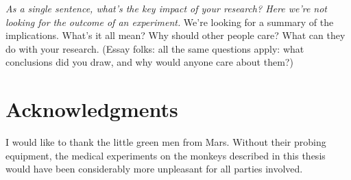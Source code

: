 \emph{As a single sentence, what’s the key impact of your research?
  Here we’re not looking for the outcome of an experiment.
}
We’re looking for a summary of the implications.
What’s it all mean?
Why should other people care?
What can they do with your research.
(Essay folks: all the same questions apply: what conclusions did you draw, and why would anyone care about them?)

\pagestyle{scrheadings}
\clearpage

\chapter*{Acknowledgments}
I would like to thank the little green men from Mars.
Without their probing equipment, the medical experiments on the monkeys described in this thesis would have been considerably more unpleasant for all parties involved.
\clearpage



%
%
\tableofcontents


\renewcommand*{\chapterpagestyle}{scrplain}
\pagestyle{scrheadings}

\ifluatex
\fi
{}


\printbibliography

